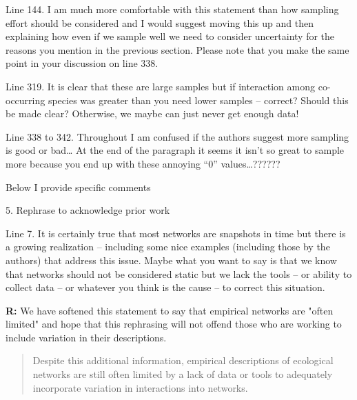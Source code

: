 \documentclass[12pt]{letter}
\newenvironment{refquote}{\bigskip \begin{it}}{\end{it}\smallskip}
\begin{document}
		\begin{refquote}
		Line 144.  I am much more comfortable with this statement than how sampling effort should be considered and I would suggest moving this up and then explaining how even if we sample well we need to consider uncertainty for the reasons you mention in the previous section.  Please note that you make the same point in your discussion on line 338.
		\end{refquote}


		\begin{refquote}
		Line 319.  It is clear that these are large samples but if interaction among co-occurring species was greater than you need lower samples – correct?  Should this be made clear?  Otherwise, we maybe can just never get enough data!
		\end{refquote}

		\begin{refquote}
		Line 338 to 342.  Throughout I am confused if the authors suggest more sampling is good or bad…  At the end of the paragraph it seems it isn’t so great to sample more because you end up with these annoying “0” values…??????
		\end{refquote}



	Below I provide specific comments
		
		5. Rephrase to acknowledge prior work

		\begin{refquote}
		Line 7.  It is certainly true that most networks are snapshots in time but there is a growing realization – including some nice examples (including those by the authors) that address this issue.  Maybe what you want to say is that we know that networks should not be considered static but we lack the tools – or ability to collect data – or whatever you think is the cause – to correct this situation. 
		\end{refquote}

		\textbf{R:} We have softened this statement to say that empirical networks are "often limited" and hope that this rephrasing will not offend those who are working to include variation in their descriptions.

			\begin{quotation}
				Despite this additional information, empirical descriptions of ecological networks are still often limited by a lack of data or tools to adequately incorporate variation in interactions into networks.
			\end{quotation}
\end{document}
